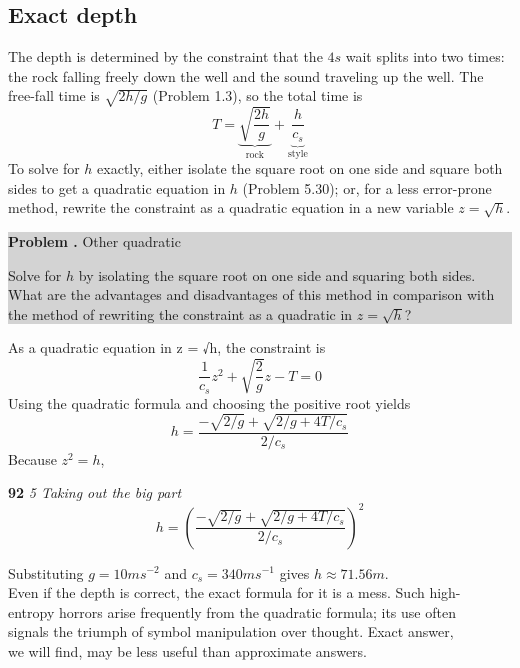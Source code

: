 \documentclass{book}
\newcounter{problem1}
\newcommand{\problem}{\par\addtocounter{problem1}{1}%
\textbf{Problem \arabic{chapter}.\arabic{problem1} }\quad}
\begin{document}
\subsection {\Large Exact depth}
\Large\noindent The depth is determined by the constraint that the $4 s$ wait splits into two
times: the rock falling freely down the well and the sound traveling up
the well. The free-fall time is $\sqrt{2h/g}$ (Problem 1.3), so the total time is
\begin{equation}
T=\underbrace{\sqrt{\frac{2h}{g}}}_{\textrm{rock}}+\underbrace{\frac{h}{c_s}}_{\textrm{style}}
\end{equation}
\Large\noindent To solve for $h$ exactly, either isolate the square root on one side and square
both sides to get a quadratic equation in $h$ (Problem 5.30); or, for a less
error-prone method, rewrite the constraint as a quadratic equation in a
new variable $z =\sqrt{h}$.\par\medskip
\colorbox{lightgray}{
\begin{minipage}{\textwidth}
\Large{{\bf \problem Other quadratic}}
\large Solve for $h$ by isolating the square root on one side and squaring both sides.
What are the advantages and disadvantages of this method in comparison with
the method of rewriting the constraint as a quadratic in $z = \sqrt{h}$?
\end{minipage}}\par\medskip
\Large As a quadratic equation in z = √h, the constraint is\\
\begin{equation}
\frac1{c_s}z^2+\sqrt{\frac2{g}}z-T=0
\end{equation}
\Large Using the quadratic formula and choosing the positive root yields\\
\begin{equation}
h=\frac{-\sqrt{2/{g}}+\sqrt{2/{g}+{4T}/{c_s}}}{2/{c_s}}
\end{equation}
\Large Because $z^2 = h$,

\newpage

\large\textbf{92} \hfill \textit{5 Taking out the big part} \\

\begin{equation}
h= \left( \frac{-\sqrt{2/{g}}+\sqrt{2/{g}+{4T}/{c_s}}}{2/{c_s}}\right)^2
\end{equation}

\Large Substituting $g=10ms^{-2}$ and $c_s=340ms^{-1}$ gives $h\approx71.56m$.\\
Even if the depth is correct, the exact formula for it is a mess. Such high-\\
entropy horrors arise frequently from the quadratic formula; its use often\\
signals the triumph of symbol manipulation over thought. Exact answer,\\
we will find, may be less  useful than approximate answers.
\end{document}
